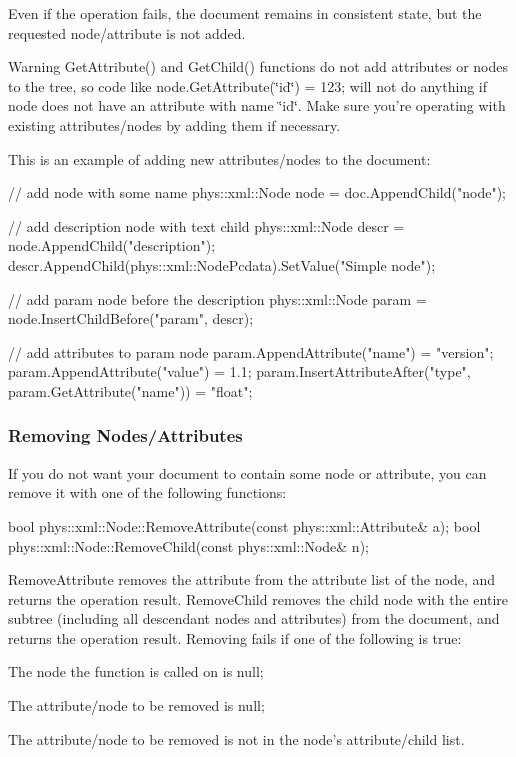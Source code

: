 Even if the operation fails, the document remains in consistent state, but the requested node/attribute is not added. \begin{DoxyWarning}{Warning}
GetAttribute() and GetChild() functions do not add attributes or nodes to the tree, so code like node.GetAttribute(\char`\"{}id\char`\"{}) = 123; will not do anything if node does not have an attribute with name \char`\"{}id\char`\"{}. Make sure you're operating with existing attributes/nodes by adding them if necessary.
\end{DoxyWarning}
This is an example of adding new attributes/nodes to the document: 
\begin{DoxyCode}
 // add node with some name
 phys::xml::Node node = doc.AppendChild("node");

 // add description node with text child
 phys::xml::Node descr = node.AppendChild("description");
 descr.AppendChild(phys::xml::NodePcdata).SetValue("Simple node");

 // add param node before the description
 phys::xml::Node param = node.InsertChildBefore("param", descr);

 // add attributes to param node
 param.AppendAttribute("name") = "version";
 param.AppendAttribute("value") = 1.1;
 param.InsertAttributeAfter("type", param.GetAttribute("name")) = "float";
\end{DoxyCode}
 \hypertarget{XMLManual_XMLModifyingRemoving}{}\subsubsection{Removing Nodes/Attributes}\label{XMLManual_XMLModifyingRemoving}
If you do not want your document to contain some node or attribute, you can remove it with one of the following functions: 
\begin{DoxyCode}
 bool phys::xml::Node::RemoveAttribute(const phys::xml::Attribute& a);
 bool phys::xml::Node::RemoveChild(const phys::xml::Node& n);
\end{DoxyCode}
 RemoveAttribute removes the attribute from the attribute list of the node, and returns the operation result. RemoveChild removes the child node with the entire subtree (including all descendant nodes and attributes) from the document, and returns the operation result. Removing fails if one of the following is true:
\begin{DoxyItemize}
\item The node the function is called on is null;
\item The attribute/node to be removed is null;
\item The attribute/node to be removed is not in the node's attribute/child list.
\end{DoxyItemize}

